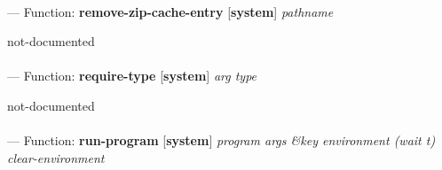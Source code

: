 \paragraph{}
\label{SYSTEM:REMOVE-ZIP-CACHE-ENTRY}
--- Function: \textbf{remove-zip-cache-entry} [\textbf{system}] \textit{pathname}

\begin{adjustwidth}{5em}{5em}
not-documented
\end{adjustwidth}

\paragraph{}
\label{SYSTEM:REQUIRE-TYPE}
--- Function: \textbf{require-type} [\textbf{system}] \textit{arg type}

\begin{adjustwidth}{5em}{5em}
not-documented
\end{adjustwidth}

\paragraph{}
\label{SYSTEM:RUN-PROGRAM}
--- Function: \textbf{run-program} [\textbf{system}] \textit{program args \&key environment (wait t) clear-environment}

